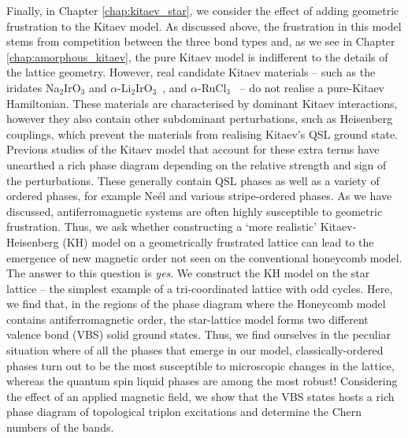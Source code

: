 Finally, in Chapter \ref{chap:kitaev_star}, we consider the effect of adding geometric frustration to the Kitaev model. As discussed above, the frustration in this model stems from competition between the three bond types and, as we see in Chapter \ref{chap:amorphous_kitaev}, the pure Kitaev model is indifferent to the details of the lattice geometry. However, real candidate Kitaev materials -- such as the iridates Na$_2$IrO$_3$ and $\alpha$-Li$_2$IrO$_3$~\cite{singh_antiferromagnetic_2010, singh_relevance_2012,revelli_fingerprints_2020}, and $\alpha$-RuCl$_3$~\cite{sandilands_scattering_2015,banerjee_proximate_2016} -- do not realise a pure-Kitaev Hamiltonian. These materials are characterised by dominant Kitaev interactions, however they also contain other subdominant perturbations, such as Heisenberg couplings, which prevent the materials from realising Kitaev's QSL ground state. Previous studies of the Kitaev model that account for these extra terms have unearthed a rich phase diagram depending on the relative strength and sign of the perturbations. These generally contain QSL phases as well as a variety of ordered phases, for example Ne\'el and various stripe-ordered phases. As we have discussed, antiferromagnetic systems are often highly susceptible to geometric frustration. Thus, we ask whether constructing a `more realistic' Kitaev-Heisenberg (KH) model on a geometrically frustrated lattice can lead to the emergence of new magnetic order not seen on the conventional honeycomb model. The answer to this question is \emph{yes}. We construct the KH model on the star lattice --  the simplest example of a tri-coordinated lattice with odd cycles. Here, we find that, in the regions of the phase diagram where the Honeycomb model contains antiferromagnetic order, the star-lattice model forms two different valence bond (VBS) solid ground states. Thus, we find ourselves in the peculiar situation where of all the phases that emerge in our model, classically-ordered phases turn out to be the most susceptible to microscopic changes in the lattice, whereas the quantum spin liquid phases are among the most robust! Considering the effect of an applied magnetic field, we show that the VBS states hosts a rich phase diagram of topological triplon excitations and determine the Chern numbers of the bands. 